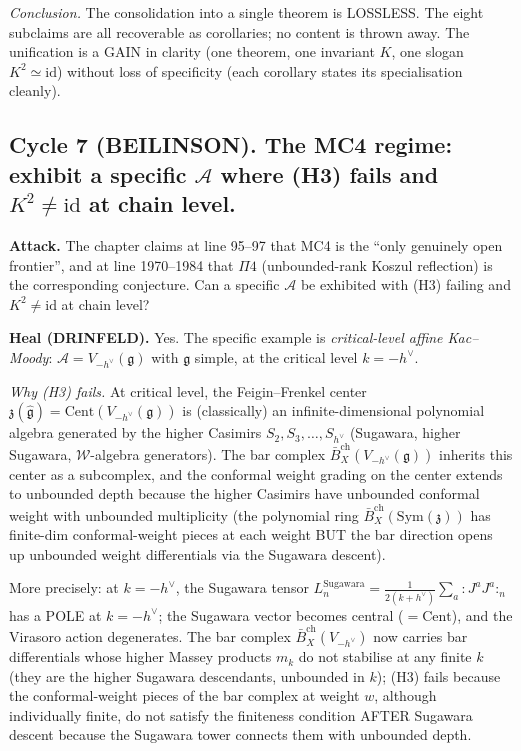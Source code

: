 \documentclass[11pt]{article}
\theoremstyle{definition}
\newcommand{\Bbarch}{\bar B^{\mathrm{ch}}}
\newcommand{\id}{\mathrm{id}}
\newcommand{\cA}{\mathcal{A}}
\begin{document}
\emph{Conclusion.} The consolidation into a single theorem is
LOSSLESS. The eight subclaims are all recoverable as corollaries;
no content is thrown away. The unification is a GAIN in
clarity (one theorem, one invariant $K$, one slogan
$K^{2}\simeq\id$) without loss of specificity (each corollary states
its specialisation cleanly).

\subsection*{Cycle 7 (BEILINSON). The MC4 regime: exhibit a specific
$\cA$ where (H3) fails and $K^{2}\neq\id$ at chain level.}

\textbf{Attack.} The chapter claims at line 95--97 that MC4 is the
``only genuinely open frontier'', and at line 1970--1984 that
$\Pi 4$ (unbounded-rank Koszul reflection) is the corresponding
conjecture. Can a specific $\cA$ be exhibited with (H3) failing and
$K^{2}\neq\id$ at chain level?

\textbf{Heal (DRINFELD).} Yes. The specific example is
\emph{critical-level affine Kac--Moody}: $\cA=V_{-h^\vee}(\mathfrak{g})$
with $\mathfrak{g}$ simple, at the critical level $k=-h^\vee$.

\emph{Why (H3) fails.} At critical level, the Feigin--Frenkel center
$\mathfrak{z}(\widehat{\mathfrak{g}})=\mathrm{Cent}(V_{-h^\vee}(\mathfrak{g}))$
is (classically) an infinite-dimensional polynomial algebra
generated by the higher Casimirs $S_2,S_3,\ldots,S_{h^\vee}$ (Sugawara,
higher Sugawara, $\mathcal{W}$-algebra generators). The bar complex
$\Bbarch_X(V_{-h^\vee}(\mathfrak{g}))$ inherits this center as a
subcomplex, and the conformal weight grading on the center extends
to unbounded depth because the higher Casimirs have unbounded
conformal weight with unbounded multiplicity (the polynomial ring
$\Bbarch_X(\mathrm{Sym}(\mathfrak{z}))$ has finite-dim conformal-weight
pieces at each weight BUT the bar direction opens up unbounded
weight differentials via the Sugawara descent).

More precisely: at $k=-h^\vee$, the Sugawara tensor
$L_n^{\mathrm{Sugawara}}=\tfrac{1}{2(k+h^\vee)}\sum_a:J^a J^a:_n$ has
a POLE at $k=-h^\vee$; the Sugawara vector becomes central
($=\mathrm{Cent}$), and the Virasoro action degenerates. The bar
complex $\Bbarch_X(V_{-h^\vee})$ now carries bar differentials whose
higher Massey products $m_k$ do not stabilise at any finite $k$
(they are the higher Sugawara descendants, unbounded in $k$); (H3)
fails because the conformal-weight pieces of the bar complex at
weight $w$, although individually finite, do not satisfy the
finiteness condition AFTER Sugawara descent because the Sugawara
tower connects them with unbounded depth.
\end{document}
